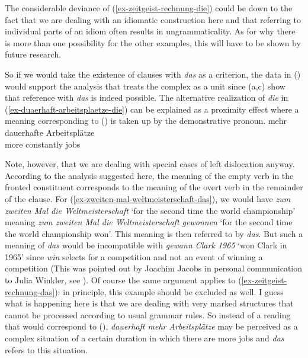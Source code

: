 The considerable deviance of (\ref{ex-zeitgeist-rechnung-die}) could be down to the fact that we are dealing with an idiomatic construction here and
that referring to individual parts of an idiom often results in ungrammaticality. As for why there is more than one possibility 
for the other examples, this will have to be shown by future research.

So if we would take the existence of clauses with \emph{das} as a criterion, the data in ()
would support the analysis that treats the complex \vf as a unit since (a,c) show that reference with \emph{das} is indeed possible. The alternative realization of
\emph{die} in (\ref{ex-duaerhaft-arbeitsplaetze-die}) can be explained as a proximity effect where a
meaning corresponding to () is taken up by the demonstrative pronoun.
\ea
\gll mehr dauerhafte Arbeitsplätze\\
     more constantly jobs\\
\z

\noindent
Note, however, that we are dealing with special cases of left dislocation anyway. According to the analysis
suggested here, the meaning of the empty verb in the fronted constituent corresponds to the meaning
of the overt verb in the remainder of the clause. For (\ref{ex-zweiten-mal-weltmeisterschaft-das}),
we would have \emph{zum zweiten Mal die Weltmeisterschaft} `for the second time the world
championship' meaning \emph{zum zweiten Mal die Weltmeisterschaft gewonnen} `for the second time the
world championship won'. This meaning is then referred to by \emph{das}. But such a meaning of
\emph{das} would be incompatible with \emph{gewann Clark 1965} `won Clark in 1965' since \emph{win}
selects for a competition and not an event of winning a competition (This was pointed out by
Joachim Jacobs in personal communication to Julia Winkler, see ). Of course the
same argument applies to (\ref{ex-zeitgeist-rechnung-das}): in principle, this example should be
excluded as well. I guess what is happening here is that we are dealing with very marked structures
that cannot be processed according to usual grammar rules. So instead of a reading that would
correspond to (), \emph{dauerhaft mehr Arbeits\-plätze} may be perceived as a complex situation of a certain duration
in which there are more jobs and \emph{das} refers to this situation.
\z
%

